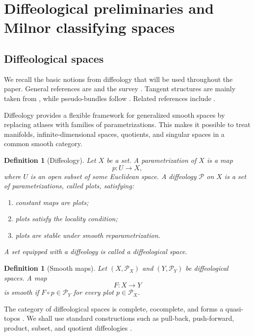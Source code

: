 \documentclass[11pt]{amsart}
\newtheorem{definition}[theorem]{Definition}
\begin{document}
	
\section{Diffeological preliminaries and Milnor classifying spaces}
\label{sec:diff-prelim}

\subsection{Diffeological spaces}

We recall the basic notions from diffeology that will be used throughout the paper. General references are \cite{IglesiasZemmour2013} and the survey \cite{GMW2023}. Tangent structures are mainly taken from \cite{ChristensenWu2016,GMW2023}, while pseudo-bundles follow \cite{Pervova2016,Magnot-Cauchy,MagnotConnections}. Related references include \cite{Pervova2017,Pervova2019}.

Diffeology provides a flexible framework for generalized smooth spaces by replacing atlases with families of parametrizations. This makes it possible to treat manifolds, infinite-dimensional spaces, quotients, and singular spaces in a common smooth category.

\begin{definition}[Diffeology]
Let \(X\) be a set. A \emph{parametrization} of \(X\) is a map
\[
p:U\to X,
\]
where \(U\) is an open subset of some Euclidean space. A \emph{diffeology} \(\mathcal P\) on \(X\) is a set of parametrizations, called \emph{plots}, satisfying:
\begin{enumerate}
\item constant maps are plots;
\item plots satisfy the locality condition;
\item plots are stable under smooth reparametrization.
\end{enumerate}
A set equipped with a diffeology is called a \emph{diffeological space}.
\end{definition}

\begin{definition}[Smooth maps]
Let \((X,\mathcal P_X)\) and \((Y,\mathcal P_Y)\) be diffeological spaces. A map
\[
F:X\to Y
\]
is \emph{smooth} if \(F\circ p\in\mathcal P_Y\) for every plot \(p\in\mathcal P_X\).
\end{definition}

The category of diffeological spaces is complete, cocomplete, and forms a quasi-topos \cite{BaezHoffnungRogers2010}. We shall use standard constructions such as pull-back, push-forward, product, subset, and quotient diffeologies \cite{Sou,IglesiasZemmour2013}.
\end{document}
